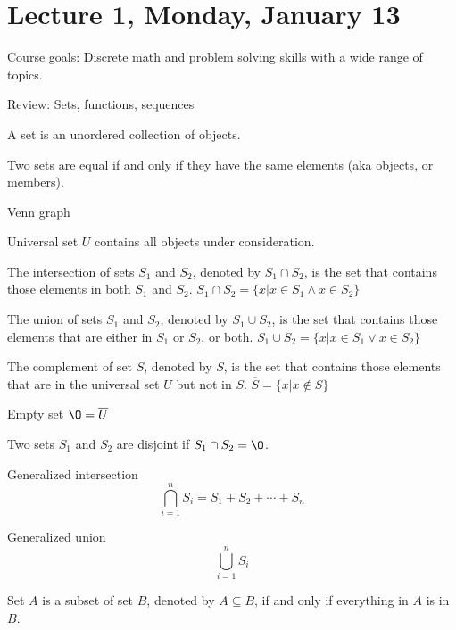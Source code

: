 \section{Lecture 1, Monday, January 13}

Course goals: Discrete math and problem solving skills with a wide range of topics.

Review: Sets, functions, sequences

\begin{defn}
A set is an unordered collection of objects.
\end{defn}

\begin{defn}
Two sets are equal if and only if they have the same elements (aka objects, or members).
\end{defn}

Venn graph

Universal set $U$ contains all objects under consideration.

\begin{defn}
The intersection of sets $S_1$ and $S_2$, denoted by $S_1 \cap S_2$, is the set that contains those elements in both $S_1$ and $S_2$. $S_1 \cap S_2 = \{ x | x \in S_1 \land x \in S_2 \}$
\end{defn}

\begin{defn}
The union of sets $S_1$ and $S_2$, denoted by $S_1 \cup S_2$, is the set that contains those elements that are either in $S_1$ or $S_2$, or both. $S_1 \cup S_2 = \{ x | x \in S_1 \lor x \in S_2 \}$
\end{defn}

\begin{defn}
The complement of set $S$, denoted by $\overline S$, is the set that contains those elements that are in the universal set $U$ but not in $S$. ${\overline S} = \{ x | x \notin S \}$
\end{defn}

Empty set $\O = {\overline U}$

\begin{defn}
Two sets $S_1$ and $S_2$ are disjoint if $S_1 \cap S_2 = \O$.
\end{defn}

Generalized intersection $$\bigcap_{i = 1}^n S_i = S_1 + S_2 + \cdots + S_n$$

Generalized union $$\bigcup_{i = 1}^n S_i$$

\begin{defn}
Set $A$ is a subset of set $B$, denoted by $A \subseteq B$, if and only if everything in $A$ is in $B$.
\end{defn}

